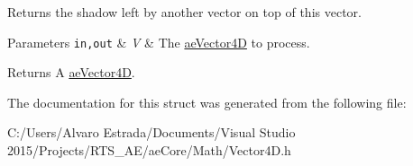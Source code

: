 Returns the shadow left by another vector on top of this vector. 


\begin{DoxyParams}[1]{Parameters}
\mbox{\tt in,out}  & {\em V} & The \hyperlink{structae_core_1_1ae_vector4_d}{ae\+Vector4D} to process.\\
\hline
\end{DoxyParams}
\begin{DoxyReturn}{Returns}
A \hyperlink{structae_core_1_1ae_vector4_d}{ae\+Vector4D}. 
\end{DoxyReturn}


The documentation for this struct was generated from the following file\+:\begin{DoxyCompactItemize}
\item 
C\+:/\+Users/\+Alvaro Estrada/\+Documents/\+Visual Studio 2015/\+Projects/\+R\+T\+S\+\_\+\+A\+E/ae\+Core/\+Math/Vector4\+D.\+h\end{DoxyCompactItemize}
